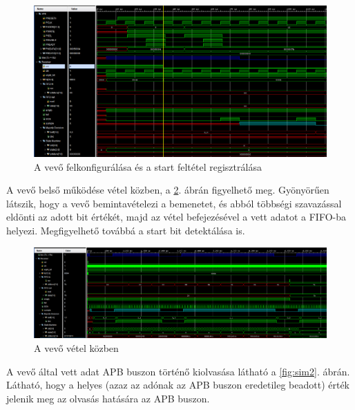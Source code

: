 \begin{figure}[h]
\vspace{0.5cm}
\begin{center}
\includegraphics[width=\textwidth]{figures/sim1.png}
\caption{A vevő felkonfigurálása és a start feltétel regisztrálása}
\label{fig:sim1}
\end{center}
\vspace{0.5cm}
\end{figure}


A vevő belső működése vétel közben, a \ref{fig:sim3}. ábrán figyelhető meg. 
Gyönyörűen látszik, hogy a vevő bemintavételezi a bemenetet, és abból többségi szavazással eldönti az adott bit értékét, majd az vétel befejezésével a vett adatot a FIFO-ba helyezi.
Megfigyelhető továbbá a start bit detektálása is.


\begin{figure}[h]
	\vspace{0.5cm}
	\begin{center}
		\includegraphics[width=\textwidth]{figures/sim3.png}
		\caption{A vevő vétel közben}
		\label{fig:sim3}
	\end{center}
	\vspace{0.5cm}
\end{figure}


A vevő által vett adat APB buszon történő kiolvasása látható a \ref{fig:sim2}. ábrán.
Látható, hogy a helyes (azaz az adónak az APB buszon eredetileg beadott) érték jelenik meg az olvasás hatására az APB buszon.


